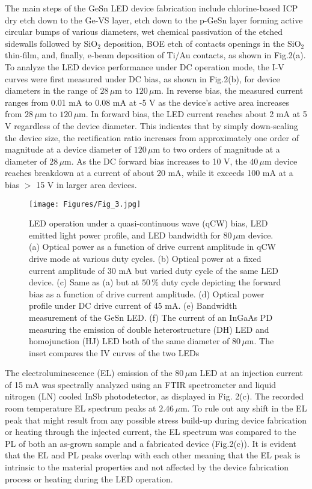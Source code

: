 The main steps of the GeSn LED device fabrication include chlorine-based ICP dry etch down to the Ge-VS layer, etch down to the p-GeSn layer forming active circular bumps of various diameters, wet chemical passivation of the etched sidewalls followed by SiO$_2$ deposition, BOE etch of contacts openings in the SiO$_2$ thin-film, and, finally, e-beam deposition of Ti/Au contacts, as shown in Fig.2(a). 
To analyze the LED device performance under DC operation mode, the I-V curves were first measured under DC bias, as shown in Fig.2(b), for device diameters in the range of $28\,\mu$m to $120\,\mu$m. In reverse bias, the measured current ranges from 0.01 mA to 0.08 mA at -5 V as the device's active area increases from $28\,\mu$m to $120\,\mu$m. In forward bias, the LED current reaches about 2 mA at 5 V regardless of the device diameter. This indicates that by simply down-scaling the device size, the rectification ratio increases from approximately one order of magnitude at a device diameter of $120\,\mu$m to two orders of magnitude at a diameter of $28\,\mu$m. As the DC forward bias increases to 10 V, the $40\,\mu$m device reaches breakdown at a current of about 20 mA, while it exceeds 100 mA at a bias $>$ 15 V in larger area devices. 


\bigskip

\begin{figure}[htbp]
\centering
\texttt{[image: Figures/Fig\_3.jpg]}
\caption{LED operation under a quasi-continuous wave (qCW) bias, LED emitted light power profile, and LED bandwidth for $80 \, \mu$m device. (a) Optical power as a function of drive current amplitude in qCW drive mode at various duty cycles. (b) Optical power at a fixed current amplitude of 30 mA but varied duty cycle of the same LED device. (c) Same as (a) but at $50 \, \%$ duty cycle depicting the forward bias as a function of drive current amplitude. (d) Optical power profile under DC drive current of 45 mA. (e) Bandwidth measurement of the GeSn LED. (f) The current of an InGaAs PD measuring the emission of double heterostructure (DH) LED and homojunction (HJ) LED both of the same diameter of $80 \, \mu$m. The inset compares the IV curves of the two LEDs}
\label{fig:Fig__3}
\end{figure}


The electroluminescence (EL) emission of the $80\,\mu$m LED at an injection current of 15 mA was spectrally analyzed using an FTIR spectrometer and liquid nitrogen (LN) cooled InSb photodetector, as displayed in Fig. 2(c). The recorded room temperature EL spectrum peaks at $2.46\,\mu$m. To rule out any shift in the EL peak that might result from any possible stress build-up during device fabrication or heating through the injected current, the EL spectrum was compared to the PL of both an as-grown sample and a fabricated device (Fig.2(c)). It is evident that the EL and PL peaks overlap with each other meaning that the EL peak is intrinsic to the material properties and not affected by the device fabrication process or heating during the LED operation. 

